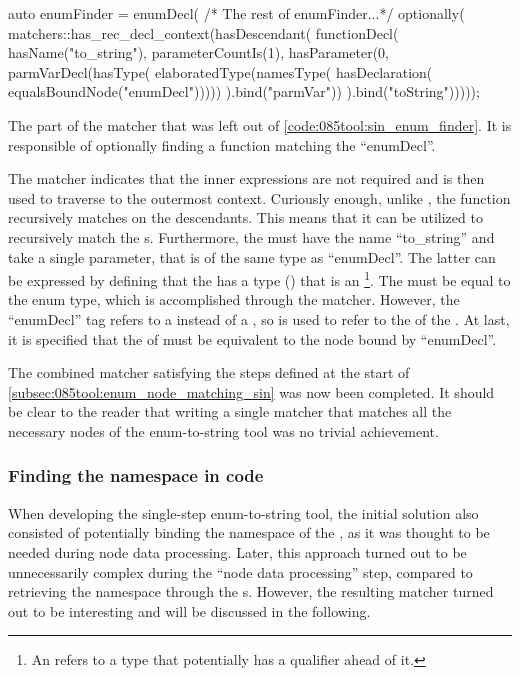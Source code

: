 \begin{listing}[H]
    \begin{cppcode}
auto enumFinder = enumDecl(
  /* The rest of enumFinder...*/
  optionally(
    matchers::has_rec_decl_context(hasDescendant(
      functionDecl(
        hasName("to_string"),
        parameterCountIs(1),
        hasParameter(0,
          parmVarDecl(hasType(
            elaboratedType(namesType(
              hasDeclaration(
                equalsBoundNode("enumDecl")))))
          ).bind("parmVar"))
      ).bind("toString")))));
    \end{cppcode}
    \caption{The part of the  matcher that was left out of \cref{code:085tool:sin_enum_finder}. It is responsible of optionally finding a  function matching the ``enumDecl''.}
    \label{code:085tool:has_enum_to_string}
\end{listing}


The  matcher indicates that the inner expressions are not required and  is then used to traverse to the outermost context.
Curiously enough, unlike , the  function recursively matches on the descendants. This means that it can be utilized to recursively match the s.
Furthermore, the  must have the name ``to\_string'' and take a single parameter, that is of the same type as ``enumDecl''.
The latter can be expressed by defining that the  has a type () that is an \footnote{
    An  refers to a type that potentially has a qualifier ahead of it.
}.
The  must be equal to the enum type, which is accomplished through the  matcher.
However, the ``enumDecl'' tag refers to a  instead of a , so  is used to refer to the  of the . At last, it is specified that the  of must be equivalent to the node bound by ``enumDecl''.

The combined matcher satisfying the steps defined at the start of \cref{subsec:085tool:enum_node_matching_sin} was now been completed.
It should be clear to the reader that writing a single matcher that matches all the necessary nodes of the enum-to-string tool was no trivial achievement.

\subsubsection*{Finding the namespace in code}
When developing the single-step enum-to-string tool, the initial solution also consisted of potentially binding the namespace of the , as it was thought to be needed during node data processing.
Later, this approach turned out to be unnecessarily complex during the ``node data processing'' step, compared to retrieving the namespace through the s.
However, the resulting matcher turned out to be interesting and will be discussed in the following.

